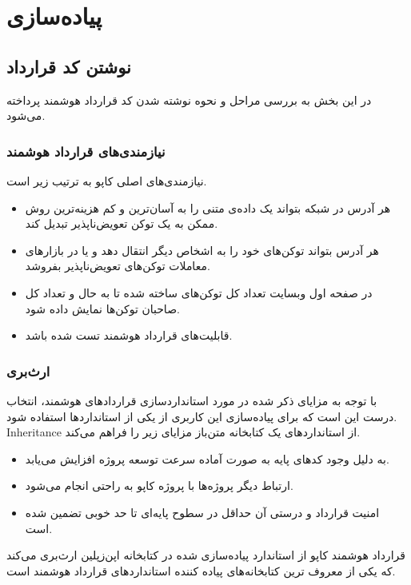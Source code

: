 \chapter{پیاده‌سازی}

\section{نوشتن کد قرارداد}
در این بخش به بررسی مراحل و نحوه نوشته شدن کد قرارداد هوشمند پرداخته می‌شود.

\subsection{نیازمندی‌های قرارداد هوشمند}
نیازمندی‌های اصلی کاپو به ترتیب زیر است.
\begin{itemize}
  \item
هر آدرس در شبکه بتواند یک داده‌ی متنی را به آسان‌ترین و کم هزینه‌ترین روش ممکن به یک توکن تعویض‌ناپذیر تبدیل کند.
  \item
هر آدرس بتواند توکن‌های خود را به اشخاص دیگر انتقال دهد و یا در بازارهای معاملات توکن‌های تعویض‌ناپذیر بفروشد.
  \item
در صفحه اول وبسایت تعداد کل توکن‌های ساخته شده تا به حال و تعداد کل صاحبان توکن‌ها نمایش داده شود.
  \item
قابلیت‌های قرارداد هوشمند تست شده باشد.
\end{itemize}

\subsection{ارث‌بری}
با توجه به مزایای ذکر شده در مورد استانداردسازی قراردادهای هوشمند،
انتخاب درست این است که برای پیاده‌سازی این کاربری از یکی از استانداردها استفاده شود.
\gls{Inheritance}
از استانداردهای یک کتابخانه متن‌باز مزایای زیر را فراهم می‌کند.
\begin{itemize}
  \item
به دلیل وجود کدهای پایه به صورت آماده سرعت توسعه پروژه افزایش می‌یابد.
  \item
ارتباط دیگر پروژه‌ها با پروژه کاپو به راحتی انجام می‌شود.
  \item
امنیت قرارداد و درستی آن حداقل در سطوح پایه‌ای تا حد خوبی تضمین شده است.
\end{itemize}

قرارداد هوشمند کاپو از استاندارد
پیاده‌سازی شده در کتابخانه اپن‌زپلین
ارث‌بری می‌کند که یکی از معروف ترین کتابخانه‌های پیاده کننده استانداردهای قرارداد هوشمند است.

